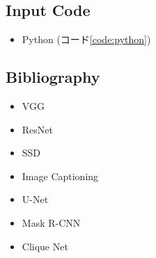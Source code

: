 \subsection{Input Code}
\begin{itemize}
  \item Python (コード\ref{code:python})
\end{itemize}


\subsection{Bibliography}
\begin{itemize}
  \item VGG \cite{bib:simonyan2014very}
  \item ResNet \cite{bib:he2016deep}
  \item SSD \cite{bib:liu2016ssd}
  \item Image Captioning \cite{bib:xu2015show}
  \item U-Net \cite{bib:ronneberger2015u}
  \item Mask R-CNN \cite{bib:he2017mask}
  \item Clique Net \cite{bib:yang2018convolutional}
\end{itemize}

